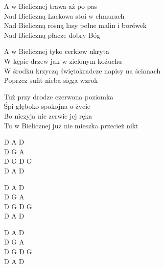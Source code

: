 \begin{text}
    A w Bielicznej trawa aż po pas\\
    Nad Bieliczną Lackowa stoi w chmurach\\
    Nad Bieliczną rosną lasy pełne malin i borówek\\
    Nad Bieliczną płacze dobry Bóg

    A w Bielicznej tyko cerkiew ukryta\\
    W kępie drzew jak w zielonym kożuchu\\
    W środku krzyczą świętokradcze napisy na ścianach\\
    Poprzez sufit nieba sięga wzrok

    Tuż przy drodze czerwona poziomka\\
    Śpi głęboko spokojna o życie\\
    Bo niczyja nie zerwie jej ręka\\
    Tu w Bielicznej już nie mieszka przecież nikt
\end{text}
\begin{chord}
    D A D\\
    D G A\\
    D G D G\\
    D A D

    D A D\\
    D G A\\
    D G D G\\
    D A D

    D A D\\
    D G A\\
    D G D G\\
    D A D
\end{chord}